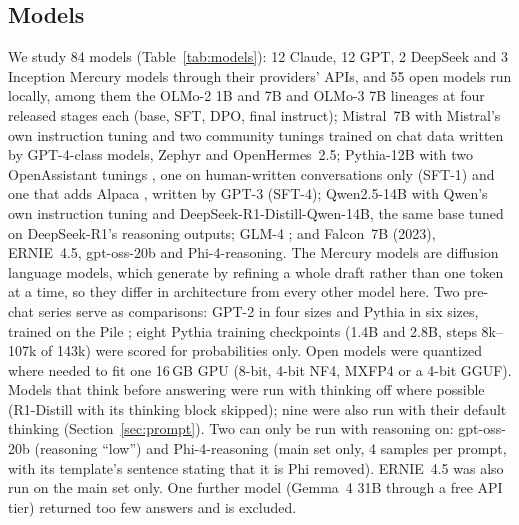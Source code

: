 \documentclass[11pt]{article}
\begin{document}
\subsection{Models}
We study 84 models (Table~\ref{tab:models}): 12 Claude, 12 GPT, 2 DeepSeek and 3 Inception Mercury models through
their providers' APIs, and 55 open models run locally, among them the OLMo-2 1B and 7B and OLMo-3 7B lineages at four released stages
each (base, SFT, DPO, final instruct); Mistral~7B \citep{jiang2023mistral} with Mistral's own instruction tuning and two
community tunings trained on chat data written by GPT-4-class models, Zephyr \citep{tunstall2023zephyr} and OpenHermes~2.5;
Pythia-12B \citep{biderman2023pythia} with two OpenAssistant tunings \citep{kopf2023openassistant}, one on
human-written conversations only (SFT-1) and one that adds Alpaca \citep{taori2023alpaca}, written by GPT-3 (SFT-4);
Qwen2.5-14B with Qwen's own instruction tuning and DeepSeek-R1-Distill-Qwen-14B, the same base tuned on DeepSeek-R1's
reasoning outputs; GLM-4 \citep{glm2024chatglm}; and Falcon~7B (2023), ERNIE~4.5, gpt-oss-20b and Phi-4-reasoning.
The Mercury models are diffusion language models, which generate by refining a whole draft rather than one token at
a time, so they differ in architecture from every other model here. Two pre-chat series serve as comparisons: GPT-2 in four sizes \citep{radford2019gpt2}
and Pythia in six sizes, trained on the Pile \citep{gao2020pile}; eight Pythia training checkpoints (1.4B and 2.8B,
steps 8k--107k of 143k) were scored for probabilities only. Open models were quantized where needed to fit one
16\,GB GPU (8-bit, 4-bit NF4, MXFP4 or a 4-bit GGUF). Models that think before answering were run with thinking off
where possible (R1-Distill with its thinking block skipped); nine were also run with their default thinking
(Section~\ref{sec:prompt}). Two can only be run with reasoning on: gpt-oss-20b (reasoning ``low'') and
Phi-4-reasoning (main set only, 4 samples per prompt, with its template's sentence stating that it is Phi removed).
ERNIE~4.5 was also run on the main set only. One further model (Gemma~4 31B through a free API tier) returned too few
answers and is excluded.
\end{document}

